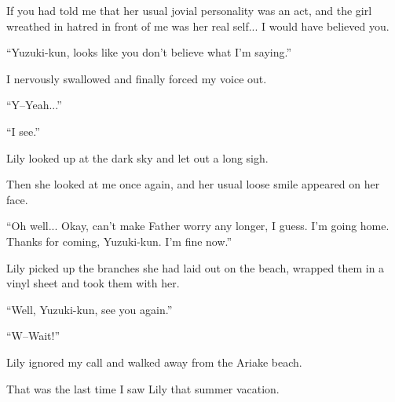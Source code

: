 If you had told me that her usual jovial personality was an act, and the girl wreathed in hatred in front of me was her real self... I would have believed you.

``Yuzuki-kun, looks like you don't believe what I'm saying.''

I nervously swallowed and finally forced my voice out.

``Y--Yeah...''

``I see.''

Lily looked up at the dark sky and let out a long sigh.

Then she looked at me once again, and her usual loose smile appeared on her face.

``Oh well... Okay, can't make Father worry any longer, I guess. I'm going home. Thanks for coming, Yuzuki-kun. I'm fine now.''

Lily picked up the branches she had laid out on the beach, wrapped them in a vinyl sheet and took them with her.

``Well, Yuzuki-kun, see you again.''

``W--Wait!''

Lily ignored my call and walked away from the Ariake beach.

That was the last time I saw Lily that summer vacation.

